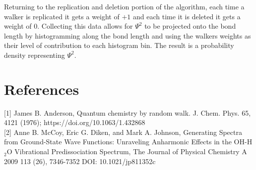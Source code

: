 \documentclass{article}
\begin{document}
Returning to the replication and deletion portion of the algorithm, each time a walker is replicated it gets a weight of $+1$ and each time it is deleted it gets a weight of $0$. Collecting this data allows for $\Psi^2$ to be projected onto the bond length by histogramming along the bond length and using the walkers weights as their level of contribution to each histogram bin. The result is a probability density representing $\Psi^2$.

\section{References}
[1] James B. Anderson, Quantum chemistry by random walk. J. Chem. Phys. 65, 4121 (1976); https://doi.org/10.1063/1.432868\\

[2] Anne B. McCoy, Eric G. Diken, and Mark A. Johnson, Generating Spectra from Ground-State Wave Functions: Unraveling Anharmonic Effects in the OH-H$_{2}$O Vibrational Predissociation Spectrum, The Journal of Physical Chemistry A 2009 113 (26), 7346-7352
DOI: 10.1021/jp811352c
\end{document}
